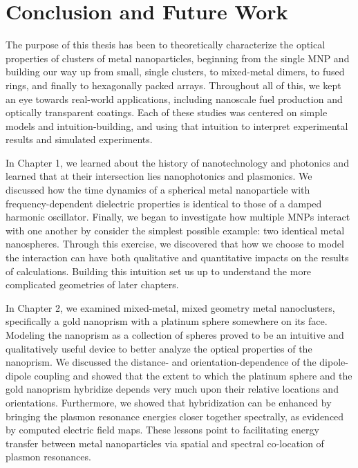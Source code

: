 \documentclass [11pt, proquest] {uwthesis}[2016/11/22]
\begin{document}
\chapter{Conclusion and Future Work}

The purpose of this thesis has been to theoretically characterize the optical properties of clusters of metal nanoparticles, beginning from the single MNP and building our way up from small, single clusters, to mixed-metal dimers, to fused rings, and finally to hexagonally packed arrays. Throughout all of this, we kept an eye towards real-world applications, including nanoscale fuel production and optically transparent coatings. Each of these studies was centered on simple models and intuition-building, and using that intuition to interpret experimental results and simulated experiments.

In Chapter 1, we learned about the history of nanotechnology and photonics and learned that at their intersection lies nanophotonics and plasmonics. We discussed how the time dynamics of a spherical metal nanoparticle with frequency-dependent dielectric properties is identical to those of a damped harmonic oscillator. Finally, we began to investigate how multiple MNPs interact with one another by consider the simplest possible example: two identical metal nanospheres. Through this exercise, we discovered that how we choose to model the interaction can have both qualitative and quantitative impacts on the results of calculations. Building this intuition set us up to understand the more complicated geometries of later chapters.

In Chapter 2, we examined mixed-metal, mixed geometry metal nanoclusters, specifically a gold nanoprism with a platinum sphere somewhere on its face. Modeling the nanoprism as a collection of spheres proved to be an intuitive and qualitatively useful device to better analyze the optical properties of the nanoprism. We discussed the distance- and orientation-dependence of the dipole-dipole coupling and showed that the extent to which the platinum sphere and the gold nanoprism hybridize depends very much upon their relative locations and orientations. Furthermore, we showed that hybridization can be enhanced by bringing the plasmon resonance energies closer together spectrally, as evidenced by computed electric field maps. These lessons point to facilitating energy transfer between metal nanoparticles via spatial and spectral co-location of plasmon resonances.
\end{document}
